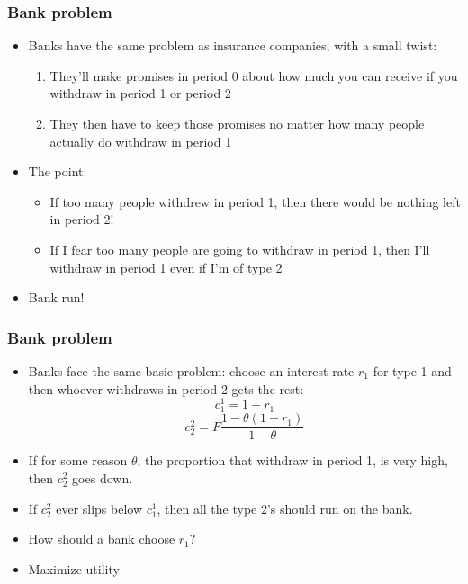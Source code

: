 \documentclass{beamer}
\begin{document}
\begin{frame}
\frametitle{Bank problem}
\begin{itemize}
\item Banks have the same problem as insurance companies, with a small twist:
\bigskip
\begin{enumerate}
\item They'll make promises in period 0 about how much you can receive if you withdraw in period 1 or period 2
\bigskip
\item They then have to keep those promises no matter how many people actually do withdraw in period 1
\end{enumerate}
\bigskip
\item The point:
\bigskip
\begin{itemize}
\item If too many people withdrew in period 1, then there would be nothing left in period 2!
\bigskip
\item If I fear too many people are going to withdraw in period 1, then I'll withdraw in period 1 even if I'm of type 2
\bigskip
\end{itemize}
\item Bank run!
\end{itemize}
\end{frame}

\begin{frame}
\frametitle{Bank problem}
\begin{itemize}
\item Banks face the same basic problem: choose an interest rate $r_1$ for type 1 and then whoever withdraws in period 2 gets the rest:
$$c_1^1=1+r_1$$
$$c_2^2=F\frac{1-\theta(1+r_1)}{1-\theta}$$
\item If for some reason $\theta$, the proportion that withdraw in period 1, is very high, then $c_2^2$ goes down.
\bigskip
\item If $c_2^2$ ever slips below $c_1^1$, then all the type 2's should run on the bank.
\bigskip
\item How should a bank choose $r_1$?
\bigskip
\item Maximize utility
\end{itemize}
\end{frame}
\end{document}
